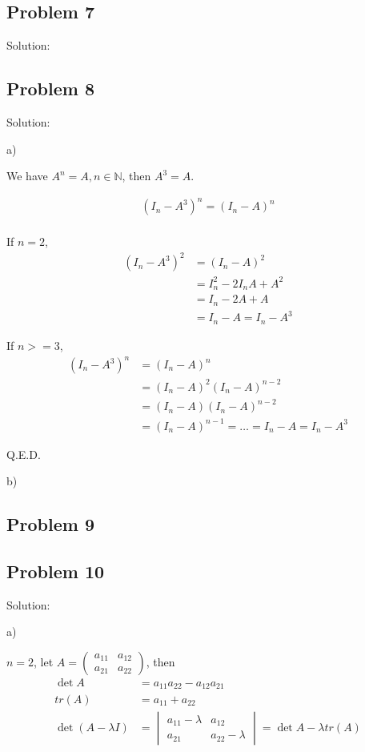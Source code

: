 \documentclass[letterpaper, 11pt]{article}
\newcommand{\1}{\mathds{1}}	%
\theoremstyle{definition}
\begin{document}
\subsection*{Problem 7}
Solution:

\subsection*{Problem 8}

Solution:

a)

We have $A ^{n} = A, n \in \mathbb{N}$, then $A ^{3} = A$.

\begin{align*}
    (I_{n}-A ^{3})^{n} = (I_{n}-A)^{n} \\
\end{align*}

If $n = 2$, \begin{align*}
    (I_{n}-A ^{3})^{2} &= (I_{n}-A)^{2} \\
    &= I_{n}^{2}-2I_{n}A + A ^{2} \\
    &= I_{n} - 2A+A \\
    &= I_{n}-A = I_{n}-A ^{3}
\end{align*}

If $n >=3$, \begin{align*}
    (I_{n}-A ^{3})^{n} &= (I_{n}-A)^{n} \\
    &= (I_{n}-A)^{2}(I_{n}-A)^{n-2} \\
    &= (I_{n}-A)(I_{n}-A)^{n-2} \\
    &= (I_{n}-A)^{n-1} = \dots = I_{n}-A = I_{n}-A ^{3}
\end{align*}

Q.E.D.

b)



\subsection*{Problem 9}

\subsection*{Problem 10}

Solution:

a)

$n=2$, let $A = \begin{pmatrix}
    a_{11} & a_{12} \\
    a_{21} & a_{22}
\end{pmatrix}$, then \begin{align*}
    \det A &= a_{11}a_{22} - a_{12}a_{21}\\
    tr(A) &= a_{11} + a_{22} \\
    \det (A-\lambda I) &= \begin{vmatrix}
    a_{11} -\lambda& a_{12} \\
    a_{21} & a_{22} -\lambda
    \end{vmatrix} = \det A - \lambda tr(A)
\end{align*}
\end{document}
